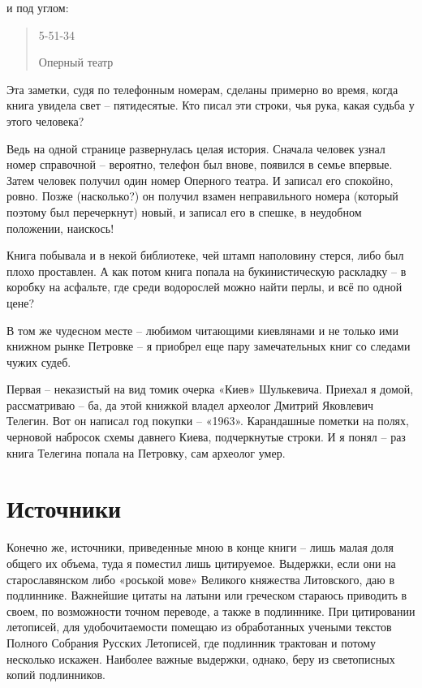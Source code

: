 и под углом:

\begin{quotation}
5-51-34

Оперный театр
\end{quotation}

Эта заметки, судя по телефонным номерам, сделаны примерно во время, когда книга увидела свет – пятидесятые. Кто писал эти строки, чья рука, какая судьба у этого человека? 

Ведь на одной странице развернулась целая история. Сначала человек узнал номер справочной – вероятно, телефон был внове, появился в семье впервые. Затем человек получил один номер Оперного театра. И записал его спокойно, ровно. Позже (насколько?) он получил взамен неправильного номера (который поэтому был перечеркнут) новый, и записал его в спешке, в неудобном положении, наискось!

Книга побывала и в некой библиотеке, чей штамп наполовину стерся, либо был плохо проставлен. А как потом книга попала на букинистическую раскладку – в коробку на асфальте, где среди водорослей можно найти перлы, и всё по одной цене?

В том же чудесном месте – любимом читающими киевлянами и не только ими книжном рынке Петровке – я приобрел еще пару замечательных книг со следами чужих судеб.

Первая – неказистый на вид томик очерка «Киев» Шулькевича. Приехал я домой, рассматриваю – ба, да  этой книжкой владел археолог Дмитрий Яковлевич Телегин. Вот он написал год покупки – «1963». Карандашные пометки на полях, черновой набросок схемы давнего Киева, подчеркнутые строки. И я понял – раз книга Телегина попала на Петровку, сам археолог умер.


\section*{Источники} 

Конечно же, источники, приведенные мною в конце книги – лишь малая доля общего их объема, туда я поместил лишь цитируемое. Выдержки, если они на старославянском либо «роськой мове» Великого княжества Литовского, даю в подлиннике. Важнейшие цитаты на латыни или греческом стараюсь приводить в своем, по возможности точном переводе, а также в подлиннике. При цитировании летописей, для удобочитаемости помещаю из обработанных учеными текстов Полного Собрания Русских Летописей, где подлинник трактован и потому несколько искажен. Наиболее важные выдержки, однако, беру из светописных копий подлинников.

